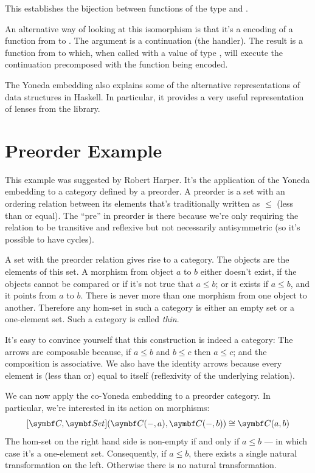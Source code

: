 This establishes the bijection between functions of the type
 and .

An alternative way of looking at this isomorphism is that it's a 
encoding of a function from  to . The argument
 is a continuation (the handler). The result
is a function from  to  which, when called with a
value of type , will execute the continuation precomposed with
the function being encoded.

The Yoneda embedding also explains some of the alternative
representations of data structures in Haskell. In particular, it
provides a 
{very useful representation}
of lenses from the  library.

\section{Preorder Example}

This example was suggested by Robert Harper. It's the application of the
Yoneda embedding to a category defined by a preorder. A preorder is a
set with an ordering relation between its elements that's traditionally
written as $\leqslant$ (less than or equal). The ``pre'' in
preorder is there because we're only requiring the relation to be
transitive and reflexive but not necessarily antisymmetric (so it's
possible to have cycles).

A set with the preorder relation gives rise to a category. The objects
are the elements of this set. A morphism from object $a$ to
$b$ either doesn't exist, if the objects cannot be compared or if
it's not true that $a \leqslant b$; or it exists if
$a \leqslant b$, and it points from $a$ to
$b$. There is never more than one morphism from one object to
another. Therefore any hom-set in such a category is either an empty set
or a one-element set. Such a category is called \emph{thin}.

It's easy to convince yourself that this construction is indeed a
category: The arrows are composable because, if
$a \leqslant b$ and $b \leqslant c$ then
$a \leqslant c$; and the composition is associative. We also
have the identity arrows because every element is (less than or) equal
to itself (reflexivity of the underlying relation).

We can now apply the co-Yoneda embedding to a preorder category. In
particular, we're interested in its action on morphisms:
\[[\cat{C}, \Set](\cat{C}(-, a), \cat{C}(-, b)) \cong \cat{C}(a, b)\]
The hom-set on the right hand side is non-empty if and only if
$a \leqslant b$ --- in which case it's a one-element set.
Consequently, if $a \leqslant b$, there exists a single
natural transformation on the left. Otherwise there is no natural
transformation.

